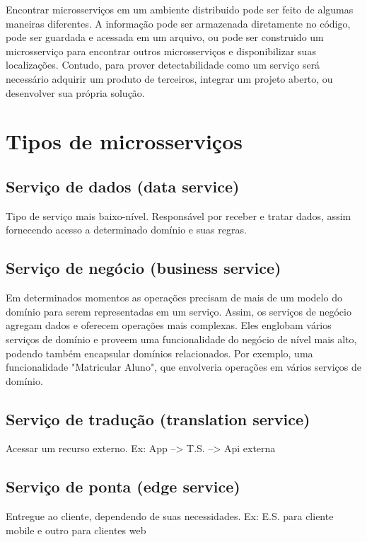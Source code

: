 Encontrar microsserviços em um ambiente distribuido pode ser feito de algumas maneiras diferentes. A informação pode ser armazenada diretamente no código, pode ser guardada e acessada em um arquivo, ou pode ser construido um microsserviço para encontrar outros microsserviços e disponibilizar suas localizações. Contudo, para prover detectabilidade como um serviço será necessário adquirir um produto de terceiros, integrar um projeto aberto, ou desenvolver sua própria solução. \cite{Familiar2015}

\section{Tipos de microsserviços}

\subsection{Serviço de dados (data service)}
Tipo de serviço mais baixo-nível. Responsável por receber e tratar dados, assim fornecendo acesso a determinado domínio e suas regras.

\subsection{Serviço de negócio (business service)}
Em determinados momentos as operações precisam de mais de um modelo do domínio para serem representadas em um serviço. Assim, os serviços de negócio agregam dados e oferecem operações mais complexas. Eles englobam vários serviços de domínio e proveem uma funcionalidade do negócio de nível mais alto, podendo também encapsular domínios relacionados. Por exemplo, uma funcionalidade "Matricular Aluno", que envolveria operações em vários serviços de domínio.

\subsection{Serviço de tradução (translation service)}
Acessar um recurso externo. Ex: App --> T.S. --> Api externa

\subsection{Serviço de ponta (edge service)}
Entregue ao cliente, dependendo de suas necessidades. Ex: E.S. para cliente mobile e outro para clientes web
